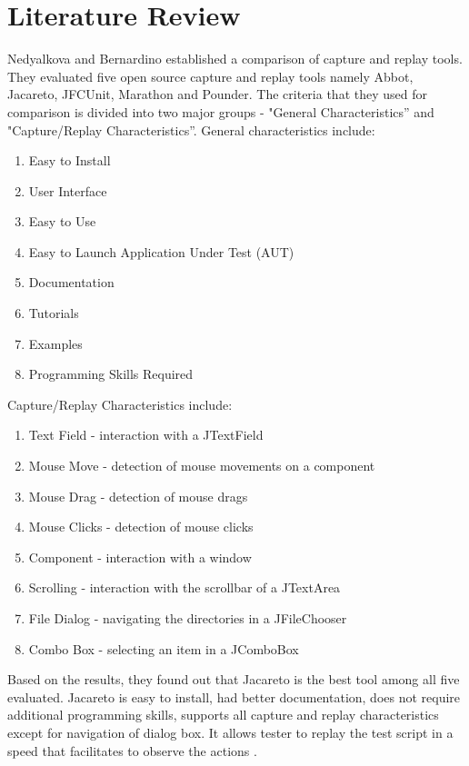 \documentclass[12pt,journal]{IEEEtran}
\begin{document}
\section{Literature Review}
Nedyalkova and  Bernardino established a comparison of capture and replay tools. They evaluated five open source capture and replay tools namely Abbot, Jacareto, JFCUnit, Marathon and Pounder. The criteria that they used for comparison is divided into two major groups - "General Characteristics'' and "Capture/Replay Characteristics''. General characteristics include:
\begin{enumerate}
\item Easy to Install
\item User Interface
\item Easy to Use
\item Easy to Launch Application Under Test (AUT)
\item Documentation
\item Tutorials
\item Examples
\item Programming Skills Required
\end{enumerate}
Capture/Replay Characteristics include:
\begin{enumerate}
\item Text Field - interaction with a JTextField
\item Mouse Move - detection of mouse movements on a component
\item Mouse Drag - detection of mouse drags
\item Mouse Clicks - detection of mouse clicks
\item Component - interaction with a window
\item Scrolling - interaction with the scrollbar of a JTextArea
\item File Dialog - navigating the directories in a JFileChooser
\item Combo Box - selecting an item in a JComboBox
\end{enumerate}
Based on the results, they found out that Jacareto is the best tool among all five evaluated. Jacareto is easy to install, had better documentation, does not require additional programming skills, supports all capture and replay characteristics except for navigation of dialog box. It allows tester to replay the test script in a speed that facilitates to observe the actions \cite{Nedyalkova:2013:OSC:2494444.2494464}.
\par
\end{document}
